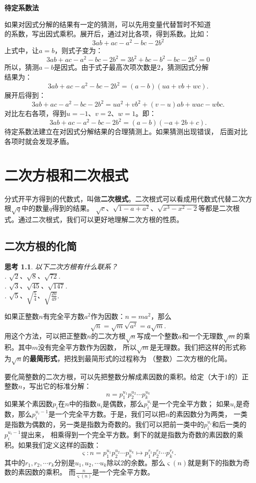 \documentclass[12pt,UTF8]{ctexbook}
\newtheorem{sk}{思考}[section]
\begin{document}
\noindent \textbf{待定系数法}

\indent 如果对因式分解的结果有一定的猜测，可以先用变量代替暂时不知道\\
\indent 的系数，写出因式乘积。展开后，通过对比各项，得到系数。比如：
$$ 3ab + ac - a^2- bc -2b^2 $$
\indent 上式中，让$a = b$，则式子变为：
$$ 3ab + ac - a^2- bc -2b^2 = 3b^2 + bc - b^2- bc -2b^2 = 0$$
\indent 所以，猜测$a - b$是因式。由于式子最高次项次数是$2$，猜测因式分解\\
\indent 结果为：
$$ 3ab + ac - a^2- bc -2b^2 = (a - b)(ua + vb + wc).$$
\indent 展开后得到：
$$ 3ab + ac - a^2- bc -2b^2 = ua^2 + vb^2 + (v - u)ab + wac - wbc. $$
\indent 对比左右各项，得到$u = -1$、$v = 2$、$w = 1$。即：
$$ 3ab + ac - a^2- bc -2b^2 = (a - b)(-a + 2b + c).$$
\indent 待定系数法建立在对因式分解结果的合理猜测上。如果猜测出现错误，
\indent 后面对比各项时就会发现矛盾。


\chapter{二次方根和二次根式}
分式开平方得到的代数式，叫做\textbf{二次根式}。二次根式可以看成用代数式代替二次方根$\sqrt{q}$中的数量$q$得到的结果。
$\sqrt{c}$、$\sqrt{1 - a + a^2}$、$\sqrt{x^3 - x^2 - 2}$等都是二次根式。通过二次根式，我们可以更好地理解二次方根的性质。
\section{二次方根的化简}
\begin{sk}\label{sk:3-0-0}
    以下二次方根有什么联系？\\
    . $\sqrt{2}$、$\sqrt{8}$、$\sqrt{72}$.\\
    . $\sqrt{3}$、$\sqrt{45}$、$\sqrt{147}$.\\
    . $\sqrt{5}$、$\sqrt{\frac{5}{4}}$、$\sqrt{\frac{20}{49}}$.
\end{sk}
如果正整数$n$有完全平方数$a^2$作为因数：$n = ma^2$，那么
$$\sqrt{n} = \sqrt{m}\sqrt{a^2} = a\sqrt{m}.$$
用这个方法，可以把正整数$n$的二次方根$\sqrt{n}$写成一个整数$a$和一个无理数$\sqrt{m}$的乘积。其中$m$没有完全平方数作为因数，
所以$\sqrt{m}$是无理数。我们把这样的形式称为$\sqrt{n}$的\textbf{最简形式}，把找到最简形式的过程称为
（整数）二次方根的化简。

要化简整数的二次方根，可以先把整数分解成素因数的乘积。给定（大于$1$的）正整数$n$，写出它的标准分解：
$$n = p_1^{u_1} p_2^{u_2} \cdots p_k^{u_k}$$
如果某个素因数$p_i$在$n$中的指数$u_i$是偶数，那么$p_i^{u_i}$是一个完全平方数；
如果$u_i$是奇数，那么$p_i^{u_i-1}$是一个完全平方数。于是，我们可以把$n$的素因数分为两类，
一类是指数为偶数的，另一类是指数为奇数的。我们可以把前一类中的$p_i^{u_i}$和后一类的$p_i^{u_i-1}$提出来，
相乘得到一个完全平方数。剩下的就是指数为奇数的素因数的乘积。如果我们定义这样的函数：
$$ \varsigma: n = p_1^{u_1} p_2^{u_2} \cdots p_k^{u_k} \mapsto p_1^{r_1} p_2^{r_2} \cdots p_k^{r_k}. $$
其中的$r_1, r_2, \cdots r_k$分别是$u_1, u_2, \cdots u_k$除以$2$的余数。那么$\varsigma(n)$就是剩下的指数为奇数的素因数的乘积。
而$\frac{n}{\varsigma(n)}$是一个完全平方数。
\end{document}

